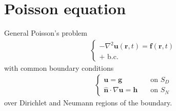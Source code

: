 \documentclass[letterpaper,10pt,italian]{jupyterBook}
\begin{document}
\section{Poisson equation}
\label{\detokenize{ch/green-function:poisson-equation}}
\sphinxAtStartPar
General Poisson’s problem
\begin{equation*}
\begin{split}\begin{cases}
  - \nabla^2 \mathbf{u}(\mathbf{r}, t) = \mathbf{f}(\mathbf{r},t) \\
  \text{+ b.c.}
\end{cases}\end{split}
\end{equation*}
\sphinxAtStartPar
with common boundary conditions
\begin{equation*}
\begin{split}\begin{cases}
\mathbf{u} = \mathbf{g} & \quad \text{on $S_D$} \\
\hat{\mathbf{n}} \cdot \nabla \mathbf{u} = \mathbf{h} & \quad \text{on $S_N$}
\end{cases}\end{split}
\end{equation*}
\sphinxAtStartPar
over Dirichlet and Neumann regions of the boundary.
\end{document}

